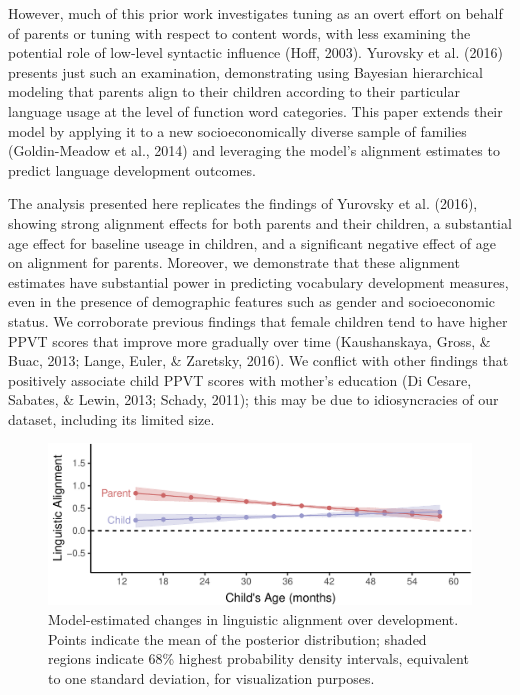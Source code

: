 \documentclass[10pt, letterpaper]{article}
\newenvironment{CodeChunk}{}{}
\begin{document}
However, much of this prior work investigates tuning as an overt effort
on behalf of parents or tuning with respect to content words, with less
examining the potential role of low-level syntactic influence (Hoff,
2003). Yurovsky et al. (2016) presents just such an examination,
demonstrating using Bayesian hierarchical modeling that parents align to
their children according to their particular language usage at the level
of function word categories. This paper extends their model by applying
it to a new socioeconomically diverse sample of families (Goldin-Meadow
et al., 2014) and leveraging the model's alignment estimates to predict
language development outcomes.

The analysis presented here replicates the findings of Yurovsky et al.
(2016), showing strong alignment effects for both parents and their
children, a substantial age effect for baseline useage in children, and
a significant negative effect of age on alignment for parents. Moreover,
we demonstrate that these alignment estimates have substantial power in
predicting vocabulary development measures, even in the presence of
demographic features such as gender and socioeconomic status. We
corroborate previous findings that female children tend to have higher
PPVT scores that improve more gradually over time (Kaushanskaya, Gross,
\& Buac, 2013; Lange, Euler, \& Zaretsky, 2016). We conflict with other
findings that positively associate child PPVT scores with mother's
education (Di Cesare, Sabates, \& Lewin, 2013; Schady, 2011); this may
be due to idiosyncracies of our dataset, including its limited size.

\begin{CodeChunk}
\begin{figure}[tb]

{\centering \includegraphics{figs/hpds-1} 

}

\caption[Model-estimated changes in linguistic alignment over development]{Model-estimated changes in linguistic alignment over development. Points indicate the mean of the posterior distribution; shaded regions indicate 68\% highest probability density intervals, equivalent to one standard deviation, for visualization purposes.}\label{fig:hpds}
\end{figure}
\end{CodeChunk}
\end{document}
